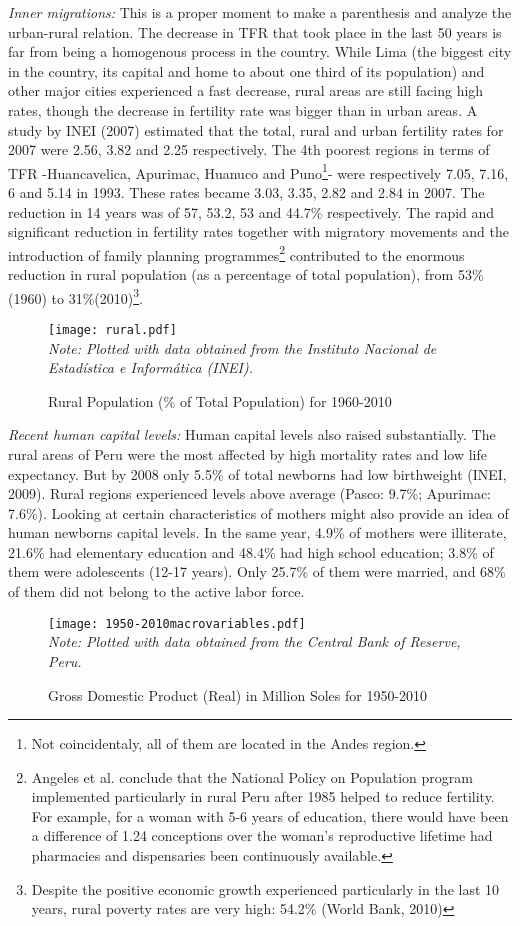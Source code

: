 \documentclass[12pt]{article}%
\begin{document}
\emph{Inner migrations:} This is a proper moment to make a parenthesis and analyze the urban-rural relation. The decrease in TFR that took place in the last 50 years is far from being a homogenous process in the country. While Lima (the biggest city in the country, its capital and home to about one third of its population) and other major cities experienced a fast decrease, rural areas are still facing high rates, though the decrease in fertility rate was bigger than in urban areas. A study by INEI (2007) estimated that the total, rural and urban fertility rates for 2007 were 2.56, 3.82 and 2.25 respectively. The 4th poorest regions in terms of TFR -Huancavelica, Apurimac, Huanuco and Puno\footnote{Not coincidentaly, all of them are located in the Andes region.}- were respectively 7.05, 7.16, 6 and 5.14 in 1993. These rates became 3.03, 3.35, 2.82 and 2.84 in 2007. The reduction in 14 years was of 57, 53.2, 53 and 44.7\% respectively. The rapid and significant reduction in fertility rates together with migratory movements and the introduction of family planning programmes\footnote{Angeles et al. conclude that the National Policy on Population program implemented particularly in rural Peru after 1985 helped to reduce fertility. For example, for a woman with 5-6 years of education, there would have been a difference of 1.24 conceptions over the woman's reproductive lifetime had pharmacies and dispensaries been continuously available.} contributed to the enormous reduction in rural population (as a percentage of total population), from 53\% (1960) to  31\%(2010)\footnote{Despite the positive economic growth experienced particularly in the last 10 years, rural poverty rates are very high: 54.2\% (World Bank, 2010)}.
\begin{figure}[h]
\caption{Rural Population (\% of Total Population) for 1960-2010}
\centering
\texttt{[image: rural.pdf]} \\
\footnotesize
\textit{Note: Plotted with data obtained from the Instituto Nacional de Estad\'istica e Inform\'atica (INEI).}
\label{rural}
\end{figure}

\emph{Recent human capital levels:} Human capital levels also raised substantially. The rural areas of Peru were the most affected by high mortality rates and low life expectancy. But by 2008 only 5.5\% of total newborns had low birthweight (INEI, 2009). Rural regions experienced levels above average (Pasco: 9.7\%; Apurimac: 7.6\%). Looking at certain characteristics of mothers might also provide an idea of human newborns capital levels. In the same year, 4.9\% of mothers were illiterate, 21.6\% had elementary education and 48.4\% had high school education; 3.8\% of them were adolescents (12-17 years). Only 25.7\% of them were married, and 68\% of them did not belong to the active labor force.
\begin{figure}[h]
\caption{Gross Domestic Product (Real) in Million Soles for 1950-2010}
\centering
\texttt{[image: 1950-2010macrovariables.pdf]} \\
\footnotesize
\textit{Note: Plotted with data obtained from the Central Bank of Reserve, Peru.}
\label{macro}
\end{figure}
\end{document}

